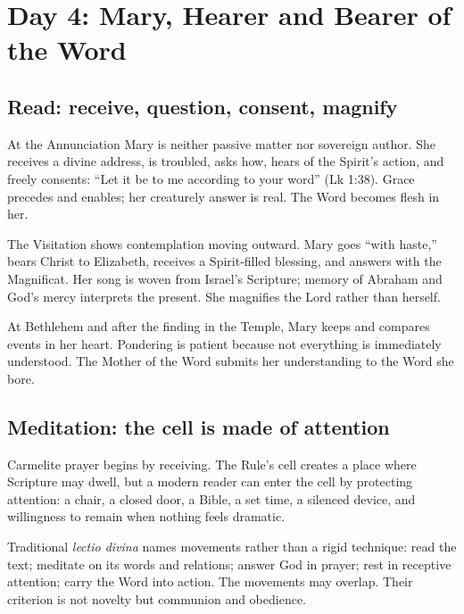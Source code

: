 \section{Day 4: Mary, Hearer and Bearer of the Word}


\subsection{Read: receive, question, consent, magnify}

At the Annunciation Mary is neither passive matter nor sovereign author. She receives a divine address, is troubled, asks how, hears of the Spirit's action, and freely consents: ``Let it be to me according to your word'' (Lk 1:38). Grace precedes and enables; her creaturely answer is real. The Word becomes flesh in her.

The Visitation shows contemplation moving outward. Mary goes ``with haste,'' bears Christ to Elizabeth, receives a Spirit-filled blessing, and answers with the Magnificat. Her song is woven from Israel's Scripture; memory of Abraham and God's mercy interprets the present. She magnifies the Lord rather than herself.

At Bethlehem and after the finding in the Temple, Mary keeps and compares events in her heart. Pondering is patient because not everything is immediately understood. The Mother of the Word submits her understanding to the Word she bore.

\subsection{Meditation: the cell is made of attention}

Carmelite prayer begins by receiving. The Rule's cell creates a place where Scripture may dwell, but a modern reader can enter the cell by protecting attention: a chair, a closed door, a Bible, a set time, a silenced device, and willingness to remain when nothing feels dramatic.

Traditional \textit{lectio divina} names movements rather than a rigid technique: read the text; meditate on its words and relations; answer God in prayer; rest in receptive attention; carry the Word into action. The movements may overlap. Their criterion is not novelty but communion and obedience.

